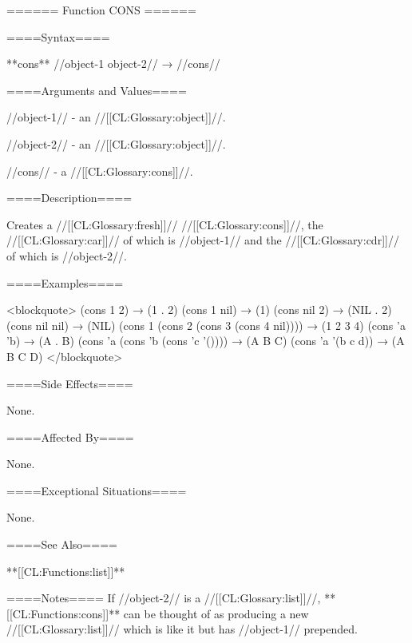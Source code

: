 ====== Function CONS ======

====Syntax====

**cons** //object-1 object-2// → //cons//

====Arguments and Values====

//object-1// - an //[[CL:Glossary:object]]//.

//object-2// - an //[[CL:Glossary:object]]//.

//cons// - a //[[CL:Glossary:cons]]//.

====Description====

Creates a //[[CL:Glossary:fresh]]// //[[CL:Glossary:cons]]//, the //[[CL:Glossary:car]]// of which is //object-1// and the //[[CL:Glossary:cdr]]// of which is //object-2//.

====Examples====

<blockquote> (cons 1 2) → (1 . 2) (cons 1 nil) → (1) (cons nil 2) → (NIL . 2) (cons nil nil) → (NIL) (cons 1 (cons 2 (cons 3 (cons 4 nil)))) → (1 2 3 4) (cons 'a 'b) → (A . B) (cons 'a (cons 'b (cons 'c '()))) → (A B C) (cons 'a '(b c d)) → (A B C D) </blockquote>

====Side Effects====

None.

====Affected By====

None.

====Exceptional Situations====

None.

====See Also====

**[[CL:Functions:list]]**

====Notes==== If //object-2// is a //[[CL:Glossary:list]]//, **[[CL:Functions:cons]]** can be thought of as producing a new //[[CL:Glossary:list]]// which is like it but has //object-1// prepended.

